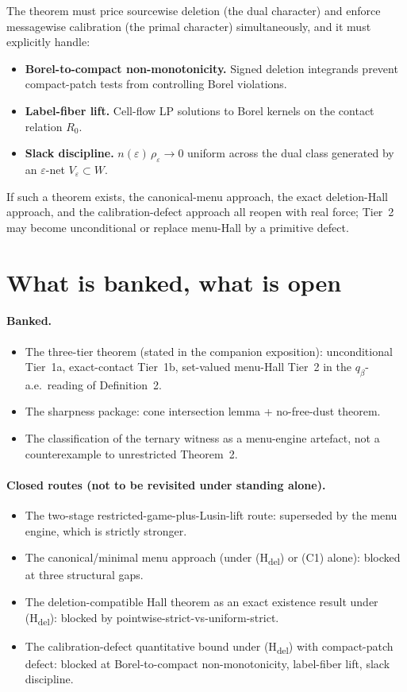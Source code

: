 \documentclass[11pt]{article}
\theoremstyle{definition}
\theoremstyle{remark}
\newcommand{\eps}{\varepsilon}
\begin{document}
The theorem must price sourcewise deletion (the dual character) and
enforce messagewise calibration (the primal character)
simultaneously, and it must explicitly handle:
\begin{itemize}[leftmargin=2em]
\item \textbf{Borel-to-compact non-monotonicity.} Signed deletion
integrands prevent compact-patch tests from controlling Borel
violations.
\item \textbf{Label-fiber lift.} Cell-flow LP solutions to Borel
kernels on the contact relation $R_0$.
\item \textbf{Slack discipline.} $n(\eps)\,\rho_\eps \to 0$ uniform
across the dual class generated by an $\eps$-net $V_\eps \subset W$.
\end{itemize}

If such a theorem exists, the canonical-menu approach, the exact
deletion-Hall approach, and the calibration-defect approach all
reopen with real force; Tier~2 may become unconditional or replace
menu-Hall by a primitive defect.

\section{What is banked, what is open}\label{sec:status}

\paragraph{Banked.}
\begin{itemize}[leftmargin=2em]
\item The three-tier theorem (stated in the companion exposition):
unconditional Tier~1a, exact-contact Tier~1b, set-valued menu-Hall
Tier~2 in the $q_\beta$-a.e.\ reading of Definition~2.
\item The sharpness package: cone intersection lemma + no-free-dust
theorem.
\item The classification of the ternary witness as a menu-engine
artefact, not a counterexample to unrestricted Theorem~2.
\end{itemize}

\paragraph{Closed routes (not to be revisited under standing alone).}
\begin{itemize}[leftmargin=2em]
\item The two-stage restricted-game-plus-Lusin-lift route: superseded
by the menu engine, which is strictly stronger.
\item The canonical/minimal menu approach (under
(H\textsubscript{del}) or (C1) alone): blocked at three structural
gaps.
\item The deletion-compatible Hall theorem as an exact existence
result under (H\textsubscript{del}): blocked by
pointwise-strict-vs-uniform-strict.
\item The calibration-defect quantitative bound under
(H\textsubscript{del}) with compact-patch defect: blocked at
Borel-to-compact non-monotonicity, label-fiber lift, slack discipline.
\end{itemize}
\end{document}
